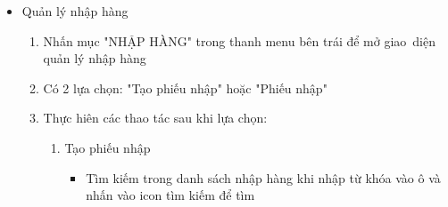 \documentclass[a4paper,12pt]{report}
\begin{document}
\begin{itemize}
\begin{itemize}
\begin{enumerate}[label=B\arabic*:]
                        \item Tìm kiếm khách hàng cần xem hoặc nhấn vào combobox vào ô cần tìm ở phía trên và nhấn icon tìm kiếm
                        \item Thực hiên các thao tác sau tùy chỉnh theo nhu cầu:
                              \begin{itemize}
                                  \item Thêm khách hàng: Khi nhấn nút icon "Thêm" sẽ hiện giao diện nhập các thông tin khách hàng (họ tên, ngày sinh, giới tính, địa~chỉ, số điện thoại, email, trạng thái sau đó nhấn nút "Lưu")
                                  \item Sửa khách hàng: Nhấn chọn 1 dòng trong bảng danh sách khách hàng để sửa thông tin cần sửa
                                  \item Xóa khách hàng: Chọn 1 dòng trong danh sách khách hàng để xóa. Hệ thống sẽ xác nhận lại có xóa không, sau đó sẽ thực hiện xóa
                                  \item Xem khách hàng: Chọn 1 dòng trong danh sách khách hàng sau đó hệ thống sẽ hiện đầy đủ thông tin khách hàng
                                  \item Xuất file Excel: Khi nhấn nút icon "Excel" thì hệ thống sẽ xuất file excel cho người dùng
                                  \item In file: Khi nhấn nút icon "In" thì hệ thống sẽ in file pdf cho người~dùng
                              \end{itemize}
                    \end{enumerate}
              \item Quản lý nhập hàng
                    \begin{enumerate}[label=B\arabic*:]
                        \item Nhấn mục "NHẬP HÀNG" trong thanh menu bên trái để mở giao~diện quản lý nhập hàng
                        \item Có 2 lựa chọn: "Tạo phiếu nhập" hoặc "Phiếu nhập"
                        \item Thực hiên các thao tác sau khi lựa chọn:
                              \begin{enumerate}[label=B3.\arabic*:]
                                  \item Tạo phiếu nhập
                                        \begin{itemize}
                                            \item Tìm kiếm trong danh sách nhập hàng khi nhập từ khóa vào ô và nhấn vào icon tìm kiếm để tìm

\end{itemize}
\end{enumerate}
\end{enumerate}
\end{itemize}
\end{itemize}
\end{document}
